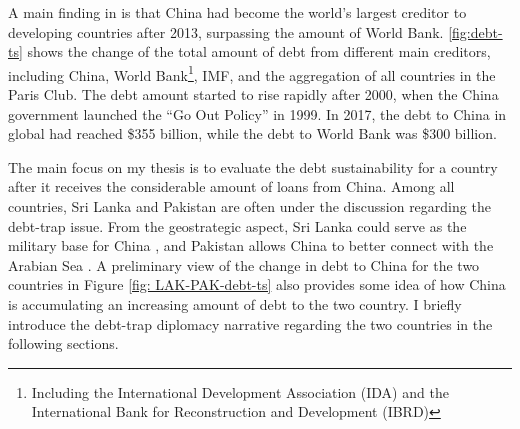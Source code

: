 A main finding in \citet*{Horn-Reinhart-Trebesch-21} is that China had become the world's largest creditor to developing countries after 2013, surpassing the amount of World Bank. \autoref{fig:debt-ts} shows the change of the total amount of debt from different main creditors, including China, World Bank\footnote{Including the International Development Association (IDA) and the International Bank for Reconstruction and Development (IBRD) }, IMF, and the aggregation of all countries in the Paris Club. The debt amount started to rise rapidly after 2000, when the China government launched the ``Go Out Policy'' in 1999. In 2017, the debt to China in global had reached \$355 billion, while the debt to World Bank was \$300 billion.

The main focus on my thesis is to evaluate the debt sustainability for a country after it receives the considerable amount of loans from China. Among all countries, Sri Lanka and Pakistan are often under the discussion regarding the debt-trap issue. From the geostrategic aspect, Sri Lanka could serve as the military base for China \citep{Chellaney_2017}, and Pakistan allows China to better connect with the Arabian Sea \citep{Hurley19-8-debt-trap}. A preliminary view of the change in debt to China for the two countries in Figure \ref{fig: LAK-PAK-debt-ts} also provides some idea of how China is accumulating an increasing amount of debt to the two country. I briefly introduce the debt-trap diplomacy narrative regarding the two countries in the following sections.